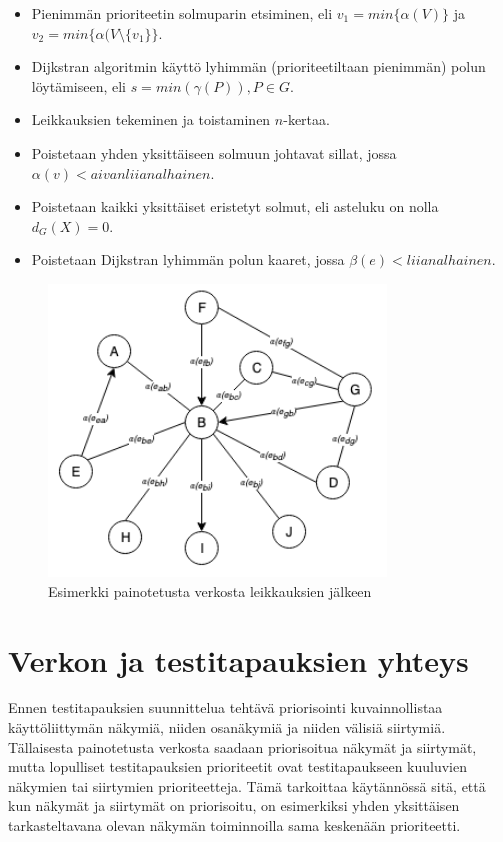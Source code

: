   \begin{itemize}
    \item Pienimmän prioriteetin solmuparin etsiminen, eli \(v_1 = min\{ \alpha(V) \}\) ja \(v_2 = min\{\alpha( V \setminus \{v_1\} \}\).
    \item Dijkstran algoritmin käyttö lyhimmän (prioriteetiltaan pienimmän) polun löytämiseen, eli \(s = min( \gamma(P) ), P \in G\).
    \item Leikkauksien tekeminen ja toistaminen \(n\)-kertaa.
    \item Poistetaan yhden yksittäiseen solmuun johtavat sillat, jossa \(\alpha(v) < aivan liian alhainen \).
    \item Poistetaan kaikki yksittäiset eristetyt solmut, eli asteluku on nolla \(d_G(X) = 0\).
    \item Poistetaan Dijkstran lyhimmän polun kaaret, jossa \(\beta(e) < liian alhainen \).
  \end{itemize}

  \begin{figure}[H]
    \centering
    \includegraphics[width=0.8\textwidth]{assets/painotettu-verkko-jalkeen.png}
    \caption{Esimerkki painotetusta verkosta leikkauksien jälkeen}
    \label{fig:painotettu-verkko-jalkeen}
  \end{figure}

\section{Verkon ja testitapauksien yhteys} \label{ch:10_verkon_ja_testitapauksien_yhteys}

  Ennen testitapauksien suunnittelua tehtävä priorisointi kuvainnollistaa käyttöliittymän näkymiä, niiden osanäkymiä ja niiden välisiä siirtymiä.
  Tällaisesta painotetusta verkosta saadaan priorisoitua näkymät ja siirtymät, mutta lopulliset testitapauksien prioriteetit ovat testitapaukseen kuuluvien näkymien tai siirtymien prioriteetteja.
  Tämä tarkoittaa käytännössä sitä, että kun näkymät ja siirtymät on priorisoitu, on esimerkiksi yhden yksittäisen tarkasteltavana olevan näkymän toiminnoilla sama keskenään prioriteetti.
